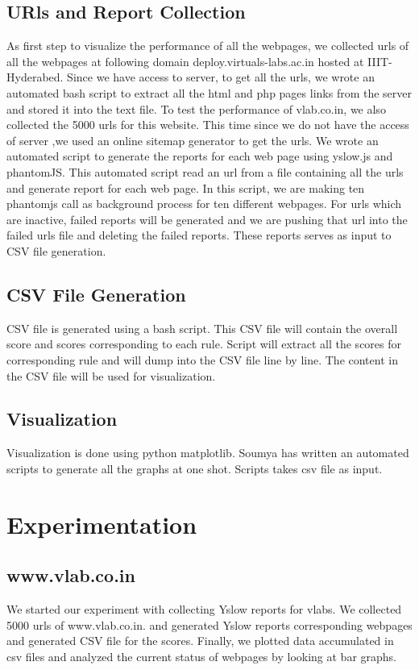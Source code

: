 \documentclass[a4paper,10pt]{IEEEtran}
\begin{document}
\subsection{URls and Report Collection}\label{sec-4.1}
As first step to visualize the performance of all the webpages, we
collected urls of all the webpages at following domain deploy.virtuals-labs.ac.in hosted at
IIIT-Hyderabed. Since we have access to server, to get all the urls, we wrote an
automated bash script to extract all the html and php pages links from the
server and stored it into the text file.
To test the performance of vlab.co.in, we also collected the 5000 urls for this
website. This time since we do not have the access of server ,we used an online
sitemap generator to get the urls.
We wrote an automated script to generate the reports for each web page using
yslow.js and phantomJS. This automated script read an url from a file containing
all the urls and generate report for each web page. In this script, we are making
ten phantomjs call as background process for ten different webpages. For urls which are inactive, failed reports will
be generated and we are pushing that url into the failed urls file and deleting
the failed reports. These reports serves as input to CSV file generation.

\subsection{CSV File Generation}\label{sec-4.2}
CSV file is generated using a bash script. This CSV file will contain the overall
score and scores corresponding to each rule. Script will extract all the scores
for corresponding rule and will dump into the CSV file line by line. The
content in the CSV file will be used for visualization.

\subsection{Visualization}\label{sec-4.3}
Visualization is done using python matplotlib. Soumya has written an automated
scripts to generate all the graphs at one shot. Scripts takes csv file as input.

\section{Experimentation}\label{sec-5}

\subsection{www.vlab.co.in}\label{sec-5.1}
We started our experiment with collecting Yslow reports for vlabs. 
We collected 5000 urls of www.vlab.co.in. and generated
Yslow reports corresponding webpages and generated CSV file for the
scores. Finally, we plotted data accumulated in csv files and analyzed the
current status of webpages by looking at bar graphs.
\end{document}

